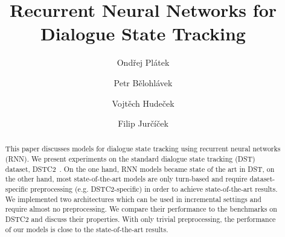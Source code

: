 \documentclass{itatnew}
\def\OP#1{\textcolor{purple}{OP: \textit{#1}}}
\def\PB#1{\textcolor{red}{PB: \textit{#1}}}
\begin{document}
\title{Recurrent Neural Networks for Dialogue State Tracking}

\author{Ondřej Plátek \and Petr Bělohlávek \and Vojtěch Hudeček  \and Filip Jurčíček}


\maketitle              %




\begin{abstract}
This paper discusses models for dialogue state tracking using recurrent neural networks (RNN).
We present experiments on the standard dialogue state tracking (DST) dataset, DSTC2~\cite{henderson2014second}.
On the one hand, RNN models became state of the art in DST,
on the other hand, most state-of-the-art models are only turn-based and require dataset-specific preprocessing (e.g. DSTC2-specific) in order to achieve state-of-the-art results.
We implemented two architectures which can be used in incremental settings and require almost no preprocessing.
We compare their performance to the benchmarks on DSTC2 and discuss their properties.
With only trivial preprocessing, the performance of our models is close to the state-of-the-art results.
\end{abstract}
%
\end{document}

